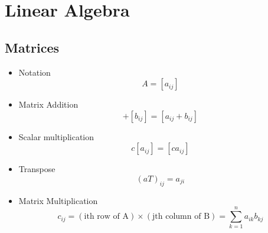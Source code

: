 \section{Linear Algebra}

\subsection{Matrices}
	\begin{itemize}
		\item Notation
			\begin{equation}
				A = [a_{ij}]
			\end{equation}
		\item Matrix Addition
			\begin{equation}[]
				[a_{ij}] + [b_{ij}] = [a_{ij} + b_{ij}]
			\end{equation}
		\item Scalar multiplication
			\begin{equation}
				c[a_{ij}] = [ca_{ij}]
			\end{equation}
		\item Transpose
			\begin{equation}
				(aT)_{ij} = a_{ji}
			\end{equation}
		\item Matrix Multiplication
			\begin{equation}
				c_{ij} = (\textrm{ith row of A}) × (\textrm{jth column of B}) = \sum_{k=1}^n a_{ik}b_{kj}
			\end{equation}
	\end{itemize}